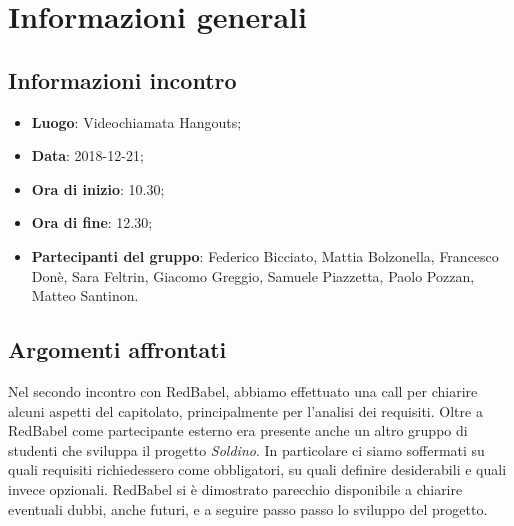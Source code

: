 \section{Informazioni generali}

\subsection{Informazioni incontro}
\begin{itemize}
\item \textbf{Luogo}: Videochiamata Hangouts;
\item \textbf{Data}: 2018-12-21;
\item \textbf{Ora di inizio}: 10.30;
\item \textbf{Ora di fine}: 12.30;
\item \textbf{Partecipanti del gruppo}: Federico Bicciato, Mattia Bolzonella, 
Francesco Donè, Sara Feltrin, Giacomo Greggio, Samuele Piazzetta, Paolo Pozzan, 
Matteo Santinon. 
\end{itemize}

\subsection{Argomenti affrontati}
Nel secondo incontro con RedBabel, abbiamo effettuato una call per chiarire alcuni aspetti del capitolato, principalmente per l'analisi dei requisiti.
Oltre a RedBabel come partecipante esterno era presente anche un altro gruppo di studenti che sviluppa il progetto \textit{Soldino}.
In particolare ci siamo soffermati su quali requisiti richiedessero come obbligatori, su quali definire desiderabili e quali invece opzionali.
RedBabel si è dimostrato parecchio disponibile a chiarire eventuali dubbi, anche futuri, e a seguire passo passo lo sviluppo del progetto.
